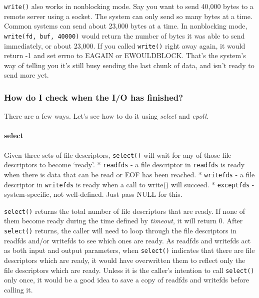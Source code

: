 \texttt{write()} also works in nonblocking mode. Say you want to send
40,000 bytes to a remote server using a socket. The system can only send
so many bytes at a time. Common systems can send about 23,000 bytes at a
time. In nonblocking mode, \texttt{write(fd,\ buf,\ 40000)} would return
the number of bytes it was able to send immediately, or about 23,000. If
you called \texttt{write()} right away again, it would return -1 and set
errno to EAGAIN or EWOULDBLOCK. That's the system's way of telling you
it's still busy sending the last chunk of data, and isn't ready to send
more yet.

\subsubsection{How do I check when the I/O has
finished?}\label{how-do-i-check-when-the-io-has-finished}

There are a few ways. Let's see how to do it using \emph{select} and
\emph{epoll}.

\paragraph{select}\label{select}

\begin{Shaded}
\begin{Highlighting}[]
      
                
\end{Highlighting}
\end{Shaded}

Given three sets of file descriptors, \texttt{select()} will wait for
any of those file descriptors to become `ready'. * \texttt{readfds} - a
file descriptor in \texttt{readfds} is ready when there is data that can
be read or EOF has been reached. * \texttt{writefds} - a file descriptor
in \texttt{writefds} is ready when a call to write() will succeed. *
\texttt{exceptfds} - system-specific, not well-defined. Just pass NULL
for this.

\texttt{select()} returns the total number of file descriptors that are
ready. If none of them become ready during the time defined by
\emph{timeout}, it will return 0. After \texttt{select()} returns, the
caller will need to loop through the file descriptors in readfds and/or
writefds to see which ones are ready. As readfds and writefds act as
both input and output parameters, when \texttt{select()} indicates that
there are file descriptors which are ready, it would have overwritten
them to reflect only the file descriptors which are ready. Unless it is
the caller's intention to call \texttt{select()} only once, it would be
a good idea to save a copy of readfds and writefds before calling it.

